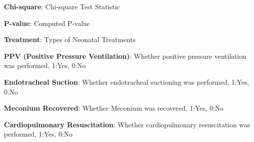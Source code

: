 \documentclass[11pt]{article}
\begin{document}
\begin{table}[h]
\caption{Association between change in new treatment policy and changes in treatments}
\label{table:TreatmentPolicyChange}
\begin{threeparttable}
\renewcommand{\TPTminimum}{\linewidth}
\begin{tablenotes}
\footnotesize
\item \textbf{Chi-square}: Chi-square Test Statistic
\item \textbf{P-value}: Computed P-value
\item \textbf{Treatment}: Types of Neonatal Treatments
\item \textbf{PPV (Positive Pressure Ventilation)}: Whether positive pressure ventilation was performed, 1:Yes, 0:No
\item \textbf{Endotracheal Suction}: Whether endotracheal suctioning was performed, 1:Yes, 0:No
\item \textbf{Meconium Recovered}: Whether Meconium was recovered, 1:Yes, 0:No
\item \textbf{Cardiopulmonary Resuscitation}: Whether cardiopulmonary resuscitation was performed, 1:Yes, 0:No

\end{tablenotes}
\end{threeparttable}
\end{table}
\end{document}
